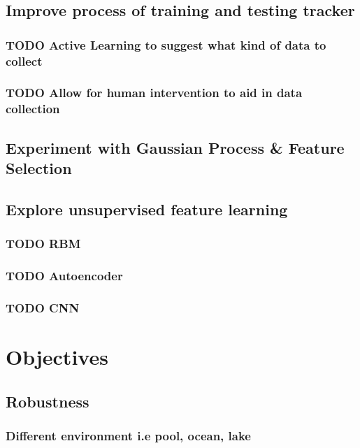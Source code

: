 \documentclass[11pt]{article}
\begin{document}
\subsection{Improve process of training and testing tracker}
\label{sec:orga286c24}
\subsubsection{{\bfseries\sffamily TODO} Active Learning to suggest what kind of data to collect}
\label{sec:orgf5e90d7}
\subsubsection{{\bfseries\sffamily TODO} Allow for human intervention to aid in data collection}
\label{sec:org8ba8875}
\subsection{Experiment with Gaussian Process \& Feature Selection}
\label{sec:org5f013b0}
\subsection{Explore unsupervised feature learning}
\label{sec:org63a4498}
\subsubsection{{\bfseries\sffamily TODO} RBM}
\label{sec:orgf020aed}
\subsubsection{{\bfseries\sffamily TODO} Autoencoder}
\label{sec:org0049608}
\subsubsection{{\bfseries\sffamily TODO} CNN}
\label{sec:orgbffbfb3}

\section{Objectives}
\label{sec:org7e68de3}
\subsection{Robustness}
\label{sec:org5061a75}
\subsubsection{Different environment i.e pool, ocean, lake}
\label{sec:orgb80577d}
\end{document}
